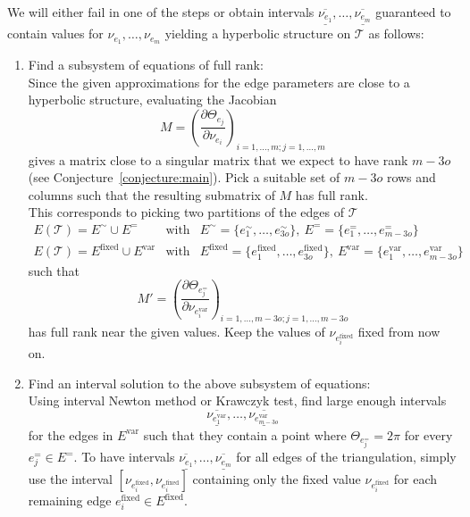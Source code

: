 \documentclass[utopia,fullpage]{nmd/article}
\newcommand{\negSpace}{\!}
\newcommand{\negSpace}{}
\newcommand\du[1]{\underline{\overline{#1}}}
\newcommand\trig{\mathcal{T}}
\begin{document}
We will either fail in one of the steps or obtain intervals $\du{\nu_{e_1}},\dots,\du{\nu_{e_m}}$ guaranteed to contain values for $\nu_{e_1},\dots,\nu_{e_m}$ yielding a hyperbolic structure on $\trig$\negSpace{} as follows:
\begin{enumerate}
\renewcommand{\labelenumi}{\Roman{enumi}.}
\renewcommand{\theenumi}{\Roman{enumi}}
\item \label{step:submatrix} Find a subsystem of equations of full rank:\\
Since the given approximations for the edge parameters are close to a hyperbolic structure, evaluating the Jacobian
\begin{equation} \label{eqn:jacobian}
M=\left(\frac{\partial \Theta_{e_j}}{\partial \nu_{e_i}}\right)_{i=1,\dots,m;j=1,\dots,m}
\end{equation}
gives a matrix close to a singular matrix that we expect to have rank $m-3o$ (see Conjecture~\ref{conjecture:main}). Pick a suitable set of  $m-3o$ rows and columns such that the resulting submatrix of $M$ has full rank.\\
This corresponds to picking two partitions of the edges of $\trig$
\begin{eqnarray*}
E(\trig)=E^\sim \cup E^=&\mbox{with}& E^\sim=\{e^\sim_1,\dots,e^\sim_{3o}\},~E^= = \{e^=_1,\dots,e^=_{m-3o}\}\\
E(\trig)=E^\mathrm{fixed} \cup E^\mathrm{var}& \mbox{with}& E^\mathrm{fixed} = \{e^{\mathrm{fixed}}_1,\dots,e^{\mathrm{fixed}}_{3o}\}, ~E^\mathrm{var} = \{e^{\mathrm{var}}_1,\dots,e^{\mathrm{var}}_{m-3o}\}
\end{eqnarray*}
such that 
$$M'=\left(\frac{\partial \Theta_{e^=_j}}{\partial \nu_{e^\mathrm{var}_i}}\right)_{i=1,\dots,m-3o;j=1,\dots,m-3o}$$
has full rank near the given values. Keep the values of $\nu_{e^\mathrm{fixed}_i}$ fixed from now on.
\item \label{step:intervalNewton} Find an interval solution to the above subsystem of equations:\\
Using interval Newton method or Krawczyk test, find large enough intervals 
$$\du{\nu_{e^\mathrm{var}_1}},\dots,\du{\nu_{e^\mathrm{var}_{m-3o}}}$$
for the edges in $E^\mathrm{var}$ such that they contain a point where $\Theta_{e^=_j}=2\pi$ for every $e^=_j\in E^=$. To have intervals $\du{\nu_{e_1}},\dots,\du{\nu_{e_m}}$ for all edges of the triangulation, simply use the interval $[\nu_{e^\mathrm{fixed}_i},\nu_{e^\mathrm{fixed}_i}]$ containing only 
the fixed value $\nu_{e^\mathrm{fixed}_i}$ for each remaining edge $e^\mathrm{fixed}_i\in E^\mathrm{fixed}$.

\end{enumerate}
\end{document}
